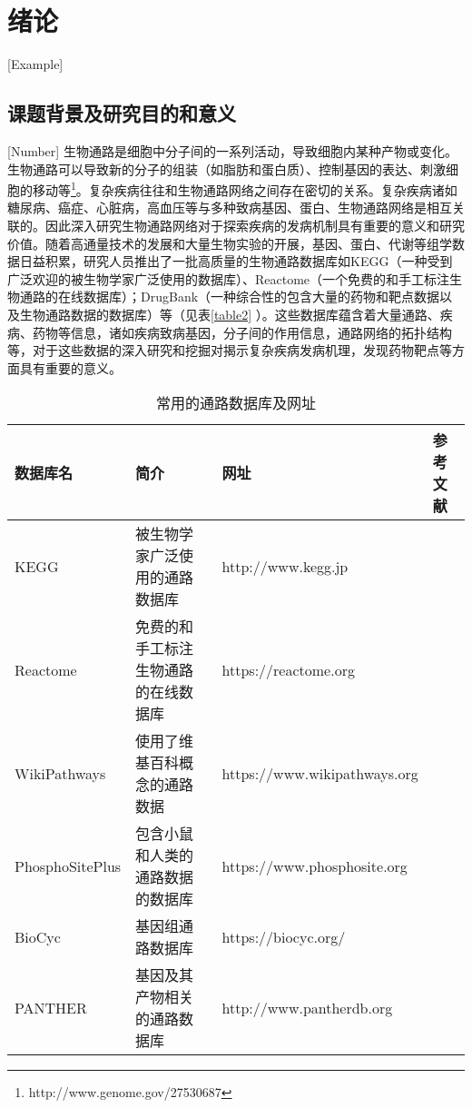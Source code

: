 \chapter{绪论}[Example]

\section{课题背景及研究目的和意义}[Number]
生物通路是细胞中分子间的一系列活动，导致细胞内某种产物或变化。生物通路可以导致新的分子的组装（如脂肪和蛋白质）、控制基因的表达、刺激细胞的移动等\footnote{http://www.genome.gov/27530687}。复杂疾病往往和生物通路网络之间存在密切的关系。复杂疾病诸如糖尿病、癌症、心脏病，高血压等与多种致病基因、蛋白、生物通路网络是相互关联的\cite{jin2011systematic}。因此深入研究生物通路网络对于探索疾病的发病机制具有重要的意义和研究价值。随着高通量技术的发展和大量生物实验的开展，基因、蛋白、代谢等组学数据日益积累，研究人员推出了一批高质量的生物通路数据库如KEGG\cite{kanehisa2008kegg}（一种受到广泛欢迎的被生物学家广泛使用的数据库）、Reactome\cite{croft2013reactome}（一个免费的和手工标注生物通路的在线数据库）；DrugBank\cite{wishart2006drugbank}（一种综合性的包含大量的药物和靶点数据以及生物通路数据的数据库）等（见表\ref{table2} ）。这些数据库蕴含着大量通路、疾病、药物等信息，诸如疾病致病基因，分子间的作用信息，通路网络的拓扑结构等，对于这些数据的深入研究和挖掘对揭示复杂疾病发病机理，发现药物靶点等方面具有重要的意义。

\begin{table}[htbp]
  \centering
	\caption[table1]{常用的通路数据库及网址}
\vspace{0.5em}\wuhao
\begin{tabularx}{1.0\textwidth}{lXXl}
\toprule[1.5pt]
数据库名 & 简介 & 网址 & 参考文献\\
\midrule[1pt]
KEGG & 被生物学家广泛使用的通路数据库 & http://www.kegg.jp & \cite{kanehisa2008kegg} \\
Reactome	& 免费的和手工标注生物通路的在线数据库	& https://reactome.org & \cite{croft2013reactome} \\
WikiPathways	& 使用了维基百科概念的通路数据	& https://www.wikipathways.org & \cite{pico2008wikipathways} \\
PhosphoSitePlus	& 包含小鼠和人类的通路数据的数据库 & https://www.phosphosite.org &	\cite{hornbeck2011phosphositeplus} \\
BioCyc 	& 基因组通路数据库& https://biocyc.org/	& \cite{krummenacker2005querying} \\
PANTHER	& 基因及其产物相关的通路数据库&http://www.pantherdb.org	& \cite{mi2016panther} \\
\bottomrule[1.5pt]
\end{tabularx}
\end{table}

